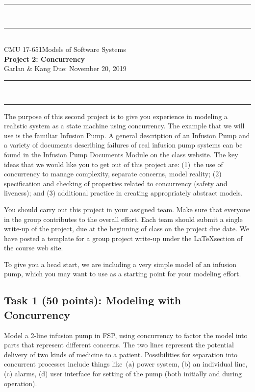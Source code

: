 \documentclass{article}
\newcommand{\head}{\subsection*}
\begin{document}

\begin{center}
\rule{\textwidth}{1.5pt} \\ \rule[10pt]{\textwidth}{1pt}\\
CMU 17-651\hfill Models of Software Systems\\[3ex]
{\Large\bf Project 2: Concurrency}\\[3ex]
Garlan \& Kang \hfill {Due: November 20, 2019} \rule{\textwidth}{1pt}
\\\rule[9.5pt]{\textwidth}{1.5pt}
\end{center}

The purpose of this second project is to give you experience in
modeling a realistic system as a state machine using concurrency.
The example that we will use is the familiar Infusion Pump.
A general description of an Infusion Pump and a variety of documents describing
failures of real infusion pump systems can be found in the
Infusion Pump Documents Module on the class website. The key
ideas that we would like you to get out of this project are: (1)~the
use of concurrency to manage complexity, separate concerns, model
reality; (2) specification and checking of properties related to concurrency (safety
and liveness); and (3) additional practice in creating appropriately
abstract models.

\bigskip You should carry out this project in your assigned team. Make sure that everyone in the
group contributes to the overall effort. Each team should submit a single write-up of the project,
due at the beginning of class on the project due date. We have posted a template for a group
project write-up under the \LaTeX section of the course web site.

\bigskip To give you a head start, we are including a very simple model of an infusion pump,
which you may want to use as a starting point for your modeling effort.

\head{Task 1 (50 points): Modeling with Concurrency}

Model a 2-line infusion pump in FSP, using concurrency to factor the model into parts that
represent different concerns. The two lines represent the potential delivery of two kinds of medicine
to a patient. Possibilities for separation into concurrent processes include things like~(a) power system,
(b) an individual line, (c) alarms, (d) user interface for setting of the pump (both initially and during operation).
\end{document}
